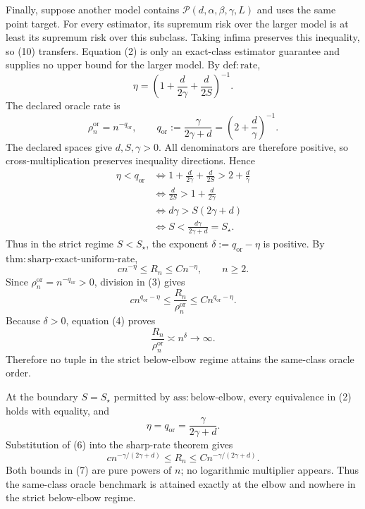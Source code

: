 Finally, suppose another model contains \(\mathcal P(d,\alpha,\beta,\gamma,L)\) and uses the same point target.  For every estimator, its supremum risk over the larger model is at least its supremum risk over this subclass.  Taking infima preserves this inequality, so (10) transfers.  Equation (2) is only an exact-class estimator guarantee and supplies no upper bound for the larger model.
By \(\mathrm{def:rate}\),
\[
 \eta=\left(1+\frac d{2\gamma}+\frac d{2S}\right)^{-1}.
\]
The declared oracle rate is
\[
 \rho_n^{\mathrm{or}}=n^{-q_{\mathrm{or}}},
 \qquad q_{\mathrm{or}}:=\frac\gamma{2\gamma+d}
 =\left(2+\frac d\gamma\right)^{-1}.                            \tag{1}
\]
The declared spaces give \(d,S,\gamma>0\).  All denominators are therefore positive, so cross-multiplication preserves inequality directions.  Hence
\[
\begin{aligned}
 \eta<q_{\mathrm{or}}
 &\Longleftrightarrow
 1+\frac d{2\gamma}+\frac d{2S}>2+\frac d\gamma\\
 &\Longleftrightarrow \frac d{2S}>1+\frac d{2\gamma}\\
 &\Longleftrightarrow d\gamma>S(2\gamma+d)\\
 &\Longleftrightarrow
 S<\frac{d\gamma}{2\gamma+d}=S_\star.                         \tag{2}
\end{aligned}
\]
Thus in the strict regime \(S<S_\star\), the exponent \(\delta:=q_{\mathrm{or}}-\eta\) is positive.  By \(\mathrm{thm:sharp\mbox{-}exact\mbox{-}uniform\mbox{-}rate}\),
\[
 cn^{-\eta}\le R_n\le Cn^{-\eta},
 \qquad n\ge2.                                                   \tag{3}
\]
Since \(\rho_n^{\mathrm{or}}=n^{-q_{\mathrm{or}}}>0\), division in (3) gives
\[
 cn^{q_{\mathrm{or}}-\eta}
 \le\frac{R_n}{\rho_n^{\mathrm{or}}}
 \le Cn^{q_{\mathrm{or}}-\eta}.                               \tag{4}
\]
Because \(\delta>0\), equation (4) proves
\[
 \frac{R_n}{\rho_n^{\mathrm{or}}}\asymp n^\delta\longrightarrow\infty. \tag{5}
\]
Therefore no tuple in the strict below-elbow regime attains the same-class oracle order.

At the boundary \(S=S_\star\) permitted by \(\mathrm{ass:below\mbox{-}elbow}\), every equivalence in (2) holds with equality, and
\[
 \eta=q_{\mathrm{or}}=\frac\gamma{2\gamma+d}.                  \tag{6}
\]
Substitution of (6) into the sharp-rate theorem gives
\[
 cn^{-\gamma/(2\gamma+d)}
 \le R_n\le Cn^{-\gamma/(2\gamma+d)}.                          \tag{7}
\]
Both bounds in (7) are pure powers of \(n\); no logarithmic multiplier appears.  Thus the same-class oracle benchmark is attained exactly at the elbow and nowhere in the strict below-elbow regime.
